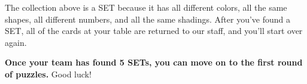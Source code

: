   The collection above is a SET because it has all different colors,
  all the same shapes, all different numbers, and all the same shadings.
  After you've found a SET, all of the cards at your table are returned
  to our staff, and you'll start over again.

  \textbf{Once your team has found 5 SETs, you can move on to the
  first round of puzzles.} Good luck!



\begin{multicols}{4}
\begin{itemize}
  
\end{itemize}
\end{multicols}
